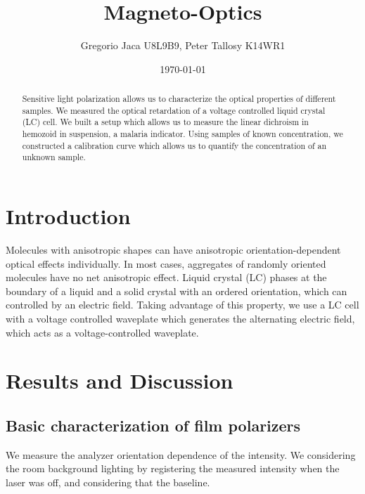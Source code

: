 \documentclass[12pt,a4paper]{article}
\title{Magneto-Optics}
\author{Gregorio Jaca U8L9B9, Peter Tallosy K14WR1}
\date{\today}
\begin{document}
\maketitle

\begin{abstract}

    Sensitive light polarization allows us to characterize the optical properties of different samples.
    We measured the optical retardation of a voltage controlled liquid crystal (LC) cell. We built a setup which allows us to measure the linear dichroism in hemozoid in suspension, a malaria indicator. Using samples of known concentration, we constructed a calibration curve which allows us to quantify the concentration of an unknown sample.

\end{abstract}

\section{Introduction}

Molecules with anisotropic shapes can have anisotropic orientation-dependent optical effects individually. In most cases, aggregates of randomly oriented molecules have no net anisotropic effect. Liquid crystal (LC) phases at the boundary of a liquid and a solid crystal with an ordered orientation, which can controlled by an electric field. Taking advantage of this property, we use a LC cell with a voltage controlled waveplate which generates the alternating electric field, which acts as a voltage-controlled waveplate.


\section{Results and Discussion}

\subsection{Basic characterization of film polarizers}


We measure the analyzer orientation dependence of the intensity. We considering the room background lighting by registering the measured intensity when the laser was off, and considering that the baseline.
\end{document}
